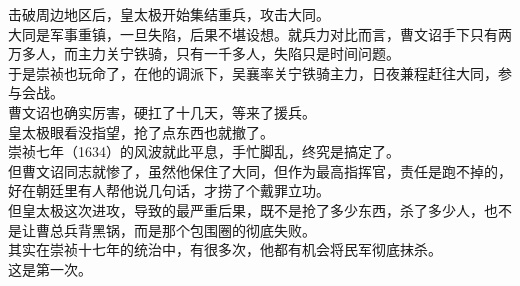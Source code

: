 \begin{multicols}{\theparacolNo}
击破周边地区后，皇太极开始集结重兵，攻击大同。\\

大同是军事重镇，一旦失陷，后果不堪设想。就兵力对比而言，曹文诏手下只有两万多人，而主力关宁铁骑，只有一千多人，失陷只是时间问题。\\

于是崇祯也玩命了，在他的调派下，吴襄率关宁铁骑主力，日夜兼程赶往大同，参与会战。\\

曹文诏也确实厉害，硬扛了十几天，等来了援兵。\\

皇太极眼看没指望，抢了点东西也就撤了。\\

崇祯七年（1634）的风波就此平息，手忙脚乱，终究是搞定了。\\

但曹文诏同志就惨了，虽然他保住了大同，但作为最高指挥官，责任是跑不掉的，好在朝廷里有人帮他说几句话，才捞了个戴罪立功。\\

但皇太极这次进攻，导致的最严重后果，既不是抢了多少东西，杀了多少人，也不是让曹总兵背黑锅，而是那个包围圈的彻底失败。\\

其实在崇祯十七年的统治中，有很多次，他都有机会将民军彻底抹杀。\\

这是第一次。\\
\ifnum{}
	\end{multicols}
\fi
\newpage
